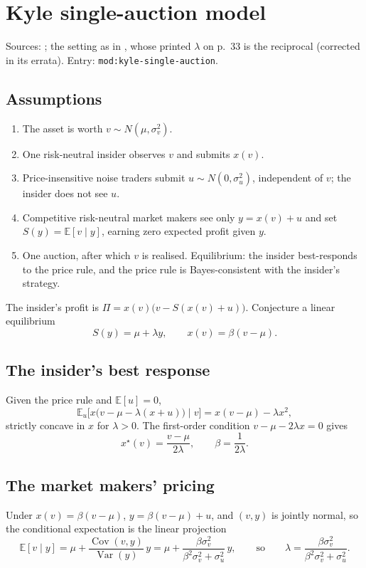 \documentclass[a4paper,oneside,openany]{book}
\begin{document}
\section*{Kyle single-auction model}

Sources: \citep[chap.~``Strategic Trader Models I: Informed Traders'', pp.~91--98, eqs.~(4.3)--(4.5), (4.17), (4.20)]{catalogue-0496}; the setting as in \citep[chap.~``A Primer on the Microstructure of Financial Markets'', pp.~31--32]{crypto-cartea}, whose printed $\lambda$ on p.~33 is the reciprocal (corrected in its errata). Entry: \texttt{mod:kyle-single-auction}.

\subsection*{Assumptions}
\begin{enumerate}[label=\roman*.]
\setlength{\itemsep}{0pt}
\item The asset is worth $v\sim N(\mu,\sigma_v^2)$.
\item One risk-neutral insider observes $v$ and submits $x(v)$.
\item Price-insensitive noise traders submit $u\sim N(0,\sigma_u^2)$, independent of $v$; the insider does not see $u$.
\item Competitive risk-neutral market makers see only $y=x(v)+u$ and set $S(y)=\mathbb{E}[v\mid y]$, earning zero expected profit given $y$.
\item One auction, after which $v$ is realised. Equilibrium: the insider best-responds to the price rule, and the price rule is Bayes-consistent with the insider's strategy.
\end{enumerate}
The insider's profit is $\Pi=x(v)\big(v-S(x(v)+u)\big)$. Conjecture a linear equilibrium
\[ S(y)=\mu+\lambda y,\qquad x(v)=\beta(v-\mu). \]

\subsection*{The insider's best response}
Given the price rule and $\mathbb{E}[u]=0$,
\[ \mathbb{E}_u\big[x\big(v-\mu-\lambda(x+u)\big)\mid v\big]=x(v-\mu)-\lambda x^2, \]
strictly concave in $x$ for $\lambda>0$. The first-order condition $v-\mu-2\lambda x=0$ gives
\[ x^\star(v)=\frac{v-\mu}{2\lambda},\qquad \beta=\frac{1}{2\lambda}. \]

\subsection*{The market makers' pricing}
Under $x(v)=\beta(v-\mu)$, $y=\beta(v-\mu)+u$, and $(v,y)$ is jointly normal, so the conditional expectation is the linear projection
\[ \mathbb{E}[v\mid y]=\mu+\frac{\operatorname{Cov}(v,y)}{\operatorname{Var}(y)}\,y=\mu+\frac{\beta\sigma_v^2}{\beta^2\sigma_v^2+\sigma_u^2}\,y,
\qquad\text{so}\qquad \lambda=\frac{\beta\sigma_v^2}{\beta^2\sigma_v^2+\sigma_u^2}. \]
\end{document}
